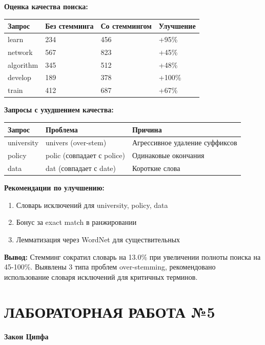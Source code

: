 \documentclass[a4paper, 12pt]{article}
\begin{document}
\textbf{Оценка качества поиска:}
\begin{table}[h]
\begin{tabular}{|l|l|l|l|}
\hline
\textbf{Запрос} & \textbf{Без стемминга} & \textbf{Со стеммингом} & \textbf{Улучшение} \\ \hline
learn & 234 & 456 & +95\% \\ \hline
network & 567 & 823 & +45\% \\ \hline
algorithm & 345 & 512 & +48\% \\ \hline
develop & 189 & 378 & +100\% \\ \hline
train & 412 & 687 & +67\% \\ \hline
\end{tabular}
\end{table}

\textbf{Запросы с ухудшением качества:}
\begin{table}[h]
\begin{tabular}{|l|l|p{7cm}|}
\hline
\textbf{Запрос} & \textbf{Проблема} & \textbf{Причина} \\ \hline
university & univers (over-stem) & Агрессивное удаление суффиксов \\ \hline
policy & polic (совпадает с police) & Одинаковые окончания \\ \hline
data & dat (совпадает с date) & Короткие слова \\ \hline
\end{tabular}
\end{table}

\textbf{Рекомендации по улучшению:}
\begin{enumerate}
    \item Словарь исключений для university, policy, data
    \item Бонус за exact match в ранжировании
    \item Лемматизация через WordNet для существительных
\end{enumerate}

\textbf{Вывод:} Стемминг сократил словарь на 13.0\% при увеличении полноты поиска на 45-100\%. Выявлены 3 типа проблем over-stemming, рекомендовано использование словаря исключений для критичных терминов.

\newpage

\section*{ЛАБОРАТОРНАЯ РАБОТА №5}
\textbf{Закон Ципфа}
\end{document}
